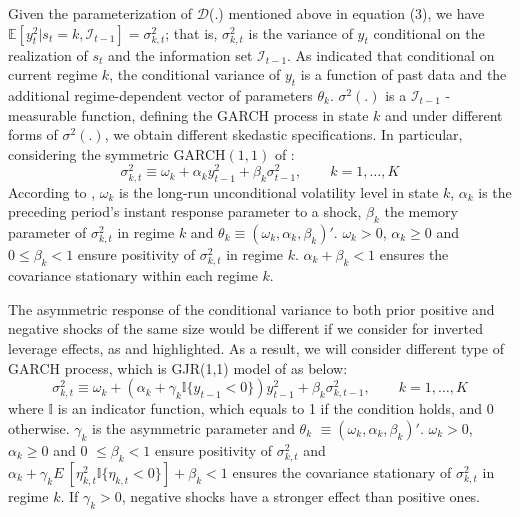 \documentclass[12pt,a4paper]{article}
\begin{document}
Given the parameterization of $\mathcal{D}$(.) mentioned above in equation (3), we have $\mathbb{E}[y^2_t \vert s_t = k, \mathcal{I}_{t-1}] = \sigma^2_{k,t}$; that is, $\sigma^2_{k,t}$ is the variance of $y_t$ conditional on the realization of $s_t$ and the information set $\mathcal{I}_{t-1}$. As \cite{haas2004new} indicated that conditional on current regime $k$, the conditional variance of $y_t$ is a function of past data and the additional regime-dependent vector of parameters \textbf{$\theta_k$}. $\sigma^2(.)$ is a $\mathcal{I}_{t-1}$ - measurable function, defining the GARCH process in state $k$ and under different forms of $\sigma^2(.)$, we obtain different skedastic specifications. In particular, considering the symmetric GARCH$(1,1)$ of \cite{bollerslev1986generalized}:
\begin{equation}
	\sigma^2_{k,t} \equiv \omega_k + \alpha_k y^2_{t-1} + \beta_k \sigma^2_{t-1}, \qquad k = 1, \ldots, K
\end{equation}
According to \cite{paolella2012mixture}, $\omega_k$ is the long-run unconditional volatility level in state $k$, $\alpha_k$ is the preceding period's instant response parameter to a shock, $\beta_k$ the memory parameter of $\sigma^2_{k,t}$ in regime $k$ and ${\theta_k} \equiv (\omega_k, \alpha_k, \beta_k)'$. $\omega_k > 0$, $\alpha_k \geq 0$ and $0 \leq \beta_k < 1$ ensure positivity of $\sigma^2_{k,t}$ in regime $k$. $\alpha_k + \beta_k < 1$ ensures the covariance stationary within each regime $k$.\par
The asymmetric response of the conditional variance to both prior positive and negative shocks of the same size would be different if we consider for inverted leverage effects, as \cite{bouri2017return} and \cite{katsiampa2017volatility} highlighted. As a result, we will consider different type of GARCH process, which is GJR(1,1) model of \cite{glosten1993relation} as below:
\begin{equation}
	 \sigma^2_{k,t} \equiv \omega_k + (\alpha_k + \gamma_k \mathbb{I}\{y_{t-1} < 0 \})y^2_{t-1}  + \beta_k \sigma^2_{k,t-1}, \qquad k = 1, \ldots, K
\end{equation}
where $\mathbb{I}$ is an indicator function, which equals to 1 if the condition holds, and 0 otherwise. $\gamma_k$ is the asymmetric parameter and \textbf{$\theta_k$} $\equiv (\omega_k, \alpha_k, \beta_k)'$. $\omega_k > 0$, $\alpha_k \geq 0$ and 0 $\leq \beta_k < 1$ ensure positivity of $\sigma^2_{k,t}$ and $\alpha_k + \gamma_k E\:[\eta^2_{k,t} \mathbb{I}\{\eta_{k,t} < 0\}] + \beta_k < 1$ ensures the covariance stationary of $\sigma^2_{k,t}$ in regime $k$. If $\gamma_k > 0$, negative shocks have a stronger effect than positive ones. \par 
\end{document}
